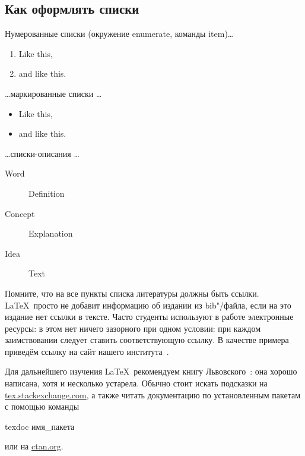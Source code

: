 \subsection{Как оформлять списки}

Нумерованные списки (окружение enumerate, команды item)…

\begin{enumerate}
  \item Like this,
  \item and like this.
\end{enumerate}

\dots маркированные списки \dots

\begin{itemize}
  \item Like this,
  \item and like this.
\end{itemize}

\dots списки-описания \dots

\begin{description}
  \item[Word] Definition
  \item[Concept] Explanation
  \item[Idea] Text
\end{description}

\Conc

Помните, что на все пункты списка литературы должны быть ссылки. \LaTeX\ просто не добавит информацию об издании из bib"/файла, если на это издание нет ссылки в тексте. Часто студенты используют в работе  электронные ресурсы: в этом нет ничего зазорного при одном условии: при каждом заимствовании следует ставить соответствующую ссылку. В качестве примера приведём ссылку на сайт нашего института~\autocite{mmcs}.

Для дальнейшего изучения \LaTeX\ рекомендуем книгу Львовского~\autocite{Lvo2003}: она хорошо написана, хотя и несколько устарела.
Обычно стоит искать подсказки на
\href{http://tex.stackexchange.com/}{tex.stackexchange.com}, а также
читать документацию по установленным пакетам с помощью
команды
\begin{Verb}
texdoc имя_пакета
\end{Verb}
или на \href{http://ctan.org/}{ctan.org}.

\printbibliography[%
    heading=bibintoc%
]

